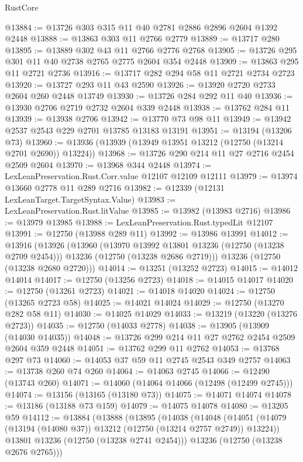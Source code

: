 \begin{lexlean}{RustCore}
\begin{coremodule}
@13884 := @13726 @303 @315 @11 @40 @2781 @2886 @2896 @2604 @1392 @2448
@13888 := @13863 @303 @11 @2766 @2779
@13889 := @13717 @280
@13895 := @13889 @302 @43 @11 @2766 @2776 @2768
@13905 := @13726 @295 @301 @11 @40 @2738 @2765 @2775 @2604 @354 @2448
@13909 := @13863 @295 @11 @2721 @2736
@13916 := @13717 @282 @294 @58 @11 @2721 @2734 @2723
@13920 := @13727 @293 @11 @43 @2590
@13926 := @13920 @2720 @2733 @2604 @260 @2448 @13749
@13930 := @13726 @284 @292 @11 @40
@13936 := @13930 @2706 @2719 @2732 @2604 @339 @2448
@13938 := @13762 @284 @11
@13939 := @13938 @2706
@13942 := @13770 @73 @98 @11
@13949 := @13942 @2537 @2543 @229 @2701 @13785 @13183 @13191
@13951 := @13194 (@13206 @73)
@13960 := @13936 (@13939 (@13949 @13951 @13212 (@12750 (@13214 @2701 @2690)) @13224))
@13968 := @13726 @290 @214 @11 @27 @2716 @2454 @2509 @2604
@13970 := @13968 @344 @2448
@13974 := LexLeanPreservation.Rust.Corr.value @12107 @12109 @12111
@13979 := @13974 @13660 @2778 @11 @289 @2716
@13982 := @12339 (@12131 LexLeanTarget.TargetSyntax.Value)
@13983 := LexLeanPreservation.Rust.litValue
@13985 := @13982 (@13983 @2716)
@13986 := @13979 @13985
@13988 := LexLeanPreservation.Rust.typedLit @12107
@13991 := @12750 (@13988 @289 @11)
@13992 := @13986 @13991
@14012 := @13916
    (@13926
      (@13960
        (@13970 @13992 @13801 @13236 (@12750 (@13238 @2709 @2454)))
        @13236
        (@12750 (@13238 @2686 @2719)))
      @13236
      (@12750 (@13238 @2680 @2720)))
@14014 := @13251 (@13252 @2723)
@14015 := @14012 @14014
@14017 := @12750 (@13256 @2723)
@14018 := @14015 @14017
@14020 := @12750 (@13261 @2723)
@14021 := @14018 @14020
@14024 := @12750 (@13265 @2723 @58)
@14025 := @14021 @14024
@14029 := @12750 (@13270 @282 @58 @11)
@14030 := @14025 @14029
@14033 := @13219 (@13220 (@13276 @2723))
@14035 := @12750 (@14033 @2778)
@14038 := @13905 (@13909 (@14030 @14035))
@14048 := @13726 @299 @214 @11 @27 @2762 @2454 @2509 @2604 @359 @2448
@14051 := @13762 @299 @11 @2762
@14053 := @13768 @297 @73
@14060 := @14053 @37 @59 @11 @2745 @2543 @349 @2757
@14063 := @13738 @260 @74 @260
@14064 := @14063 @2745
@14066 := @12490 (@13743 @260)
@14071 := @14060 (@14064 @14066 (@12498 (@12499 @2745)))
@14074 := @13156 (@13165 (@13180 @73))
@14075 := @14071 @14074
@14078 := @13186 (@13188 @73 @159)
@14079 := @14075 @14078
@14080 := @13205 @59
@14112 := @13884
    (@13888
      (@13895
        (@14038
          (@14048
            (@14051 (@14079 (@13194 (@14080 @37)) @13212 (@12750 (@13214 @2757 @2749)) @13224))
            @13801
            @13236
            (@12750 (@13238 @2741 @2454)))
          @13236
          (@12750 (@13238 @2676 @2765)))

\end{coremodule}
\end{lexlean}
